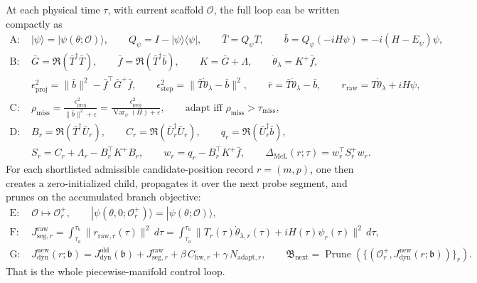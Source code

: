 \documentclass[11pt]{article}
\begin{document}
At each physical time $\tau$, with current scaffold $\mathcal O$, the full loop can be written compactly as
\[
\begin{aligned}
\text{A: }&
|\psi\rangle=|\psi(\theta;\mathcal O)\rangle,
\qquad
Q_\psi=I-|\psi\rangle\langle\psi|,
\qquad
\bar T=Q_\psi T,
\qquad
\bar b=Q_\psi(-iH\psi)=-i(H-E_\psi)\psi,\\
\text{B: }&
\bar G=\Re(\bar T^\dagger\bar T),
\qquad
\bar f=\Re(\bar T^\dagger\bar b),
\qquad
K=\bar G+\Lambda,
\qquad
\dot\theta_\lambda=K^+\bar f,\\
&
\epsilon_{\mathrm{proj}}^2=\|\bar b\|^2-\bar f^\top\bar G^+\bar f,
\qquad
\epsilon_{\mathrm{step}}^2=\|\bar T\dot\theta_\lambda-\bar b\|^2,
\qquad
\bar r=\bar T\dot\theta_\lambda-\bar b,
\qquad
r_{\mathrm{raw}}=T\dot\theta_\lambda+iH\psi,\\
\text{C: }&
\rho_{\mathrm{miss}}
=
\frac{\epsilon_{\mathrm{proj}}^2}{\|\bar b\|^2+\varepsilon}
=
\frac{\epsilon_{\mathrm{proj}}^2}{\operatorname{Var}_\psi(H)+\varepsilon},
\qquad
\text{adapt iff }\rho_{\mathrm{miss}}>\tau_{\mathrm{miss}},\\
\text{D: }&
B_r=\Re(\bar T^\dagger\bar U_r),
\qquad
C_r=\Re(\bar U_r^\dagger\bar U_r),
\qquad
q_r=\Re(\bar U_r^\dagger\bar b),\\
&
S_r=C_r+\Lambda_r-B_r^\top K^+B_r,
\qquad
w_r=q_r-B_r^\top K^+\bar f,
\qquad
\Delta_{\mathrm{McL}}(r;\tau)=w_r^\top S_r^+w_r.
\end{aligned}
\]
For each shortlisted admissible candidate-position record $r=(m,p)$, one then creates a zero-initialized child, propagates it over the next probe segment, and prunes on the accumulated branch objective:
\[
\begin{aligned}
\text{E: }&
\mathcal O\mapsto\mathcal O_r^+,
\qquad
|\psi(\theta,0;\mathcal O_r^+)\rangle=|\psi(\theta;\mathcal O)\rangle,\\
\text{F: }&
J_{\mathrm{seg},r}^{\mathrm{raw}}
=
\int_{\tau_a}^{\tau_b}\|r_{\mathrm{raw},r}(\tau)\|^2\,d\tau
=
\int_{\tau_a}^{\tau_b}\bigl\|T_r(\tau)\dot\theta_{\lambda,r}(\tau)+iH(\tau)\psi_r(\tau)\bigr\|^2\,d\tau,\\
\text{G: }&
J_{\mathrm{dyn}}^{\mathrm{new}}(r;\mathfrak b)
=
J_{\mathrm{dyn}}^{\mathrm{old}}(\mathfrak b)
+
J_{\mathrm{seg},r}^{\mathrm{raw}}
+
\beta\,C_{\mathrm{hw},r}
+
\gamma\,N_{\mathrm{adapt},r},
\qquad
\mathfrak B_{\mathrm{next}}
=
\operatorname{Prune}\!\left(\{(\mathcal O_r^+,J_{\mathrm{dyn}}^{\mathrm{new}}(r;\mathfrak b))\}_r\right).
\end{aligned}
\]
That is the whole piecewise-manifold control loop.
\end{document}
